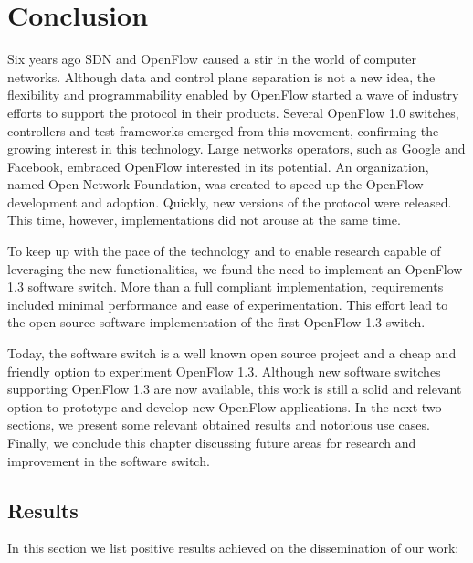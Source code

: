 \chapter{Conclusion}
\label{cap:conclusion}

Six years ago SDN and OpenFlow caused a stir in the world of computer networks. Although data and control plane separation is not a new idea, the flexibility and programmability enabled by OpenFlow started a wave of industry efforts to support the protocol in their products. Several OpenFlow 1.0 switches, controllers and test frameworks emerged from this movement, confirming the growing interest in this technology. Large networks operators, such as Google and Facebook, embraced OpenFlow interested in its potential. An organization, named Open Network Foundation, was created to speed up the OpenFlow development and adoption. Quickly, new versions of the protocol were released. This time, however, implementations did not arouse at the same time.

To keep up with the pace of the technology and to enable research capable of leveraging the new functionalities, we found the need to implement an OpenFlow 1.3 software switch. More than a full compliant implementation, requirements included minimal performance and ease of experimentation. This effort lead to the open source software implementation of the first OpenFlow 1.3 switch. 

Today, the software switch is a well known open source project and a cheap and friendly option to experiment OpenFlow 1.3. Although new software switches supporting OpenFlow 1.3 are now available, this work is still a solid and relevant option to prototype and develop new OpenFlow applications. In the next two sections, we present some relevant obtained results and notorious use cases. Finally, we conclude this chapter discussing future areas for research and improvement in the software switch.     

\section{Results}
\label{sec:results}

In this section we list positive results achieved on the dissemination of our work:  

